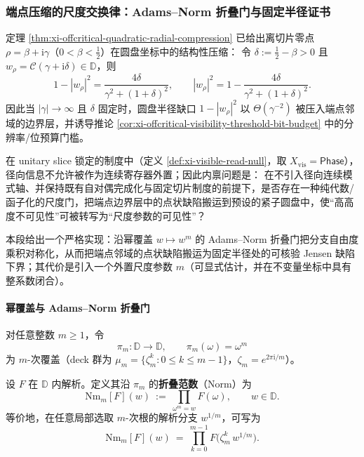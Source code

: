 \subsubsection{端点压缩的尺度交换律：Adams--Norm 折叠门与固定半径证书}\label{subsubsec:xi-adams-norm-scale-transport}
定理 \ref{thm:xi-offcritical-quadratic-radial-compression} 已给出离切片零点
\(\rho=\beta+\mathrm{i}\gamma\)（\(0<\beta<\tfrac12\)）在圆盘坐标中的结构性压缩：
令 \(\delta:=\tfrac12-\beta>0\) 且 \(w_\rho=\mathcal{C}(\gamma+\mathrm{i}\delta)\in\mathbb{D}\)，则
\[
1-|w_\rho|^2=\frac{4\delta}{\gamma^2+(1+\delta)^2},
\qquad
|w_\rho|^2=1-\frac{4\delta}{\gamma^2+(1+\delta)^2}.
\]
因此当 \(|\gamma|\to\infty\) 且 \(\delta\) 固定时，圆盘半径缺口 \(1-|w_\rho|^2\) 以 \(\Theta(\gamma^{-2})\) 被压入端点邻域的边界层，并诱导推论 \ref{cor:xi-offcritical-visibility-threshold-bit-budget} 中的分辨率/位预算门槛。
\par
在 unitary slice 锁定的制度中（定义 \ref{def:xi-visible-read-null}，取 \(X_{\mathrm{vis}}=\mathsf{Phase}\)），径向信息不允许被作为连续寄存器外置；因此内禀问题是：
在不引入径向连续模式轴、并保持既有自对偶完成化与固定切片制度的前提下，是否存在一种纯代数/函子化的尺度门，把端点边界层中的点状缺陷搬运到预设的紧子圆盘中，使“高高度不可见性”可被转写为“尺度参数的可见性”？
\par
本段给出一个严格实现：沿幂覆盖 \(w\mapsto w^m\) 的 Adams--Norm 折叠门把分支自由度乘积对称化，从而把端点邻域的点状缺陷搬运为固定半径处的可核验 Jensen 缺陷下界；其代价是引入一个外置尺度参数 \(m\)（可显式估计，并在不变量坐标中具有整系数闭合）。

\paragraph{幂覆盖与 Adams--Norm 折叠门}
对任意整数 \(m\ge 1\)，令
\[
\pi_m:\mathbb{D}\to\mathbb{D},\qquad \pi_m(\omega)=\omega^m
\]
为 \(m\)-次覆盖（deck 群为 \(\mu_m=\{\zeta_m^k:0\le k\le m-1\}\)，\(\zeta_m=e^{2\pi\mathrm{i}/m}\)）。

\begin{definition}\label{def:xi-adams-norm-fold}
设 \(F\) 在 \(\mathbb{D}\) 内解析。定义其沿 \(\pi_m\) 的\textbf{折叠范数}（Norm）为
\begin{equation}\label{eq:xi-adams-norm-def}
\boxed{\;
\mathrm{Nm}_m[F](w)
~:=~
\prod_{\omega^m=w}F(\omega),
\qquad w\in\mathbb{D}.
\;}
\end{equation}
等价地，在任意局部选取 \(m\)-次根的解析分支 \(w^{1/m}\)，可写为
\begin{equation}\label{eq:xi-adams-norm-branch}
\mathrm{Nm}_m[F](w)
~=~
\prod_{k=0}^{m-1}F\!\bigl(\zeta_m^k\,w^{1/m}\bigr).
\end{equation}
\end{definition}

